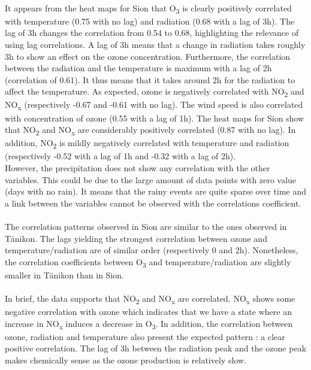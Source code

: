 \documentclass[a4paper, 12pt]{article}
\begin{document}
        \\
        It appears from the heat maps for Sion that O\textsubscript{3} is clearly positively correlated with temperature (0.75 with no lag) and radiation (0.68 with a lag of 3h). The lag of 3h changes the correlation from 0.54 to 0.68, highlighting the relevance of using lag correlations. A lag of 3h means that a change in radiation takes roughly 3h to show an effect on the ozone concentration. Furthermore, the correlation between the radiation and the temperature is maximum with a lag of 2h (correlation of 0.61). It thus means that it takes around 2h for the radiation to affect the temperature. As expected, ozone is negatively correlated with NO\textsubscript{2} and NO\textsubscript{x} (respectively -0.67 and -0.61 with no lag). The wind speed is also correlated with concentration of ozone (0.55 with a lag of 1h). The heat maps for Sion show that NO\textsubscript{2} and NO\textsubscript{x} are considerably positively correlated (0.87 with no lag). In addition, NO\textsubscript{2} is mildly negatively correlated with temperature and radiation (respectively -0.52 with a lag of 1h and -0.32 with a lag of 2h).
        \\
        However, the precipitation does not show any correlation with the other variables. This could be due to the large amount of data points with zero value (days with no rain). It means that the rainy events are quite sparse over time and a link between the variables cannot be observed with the correlations coefficient. \\
        \\
        The correlation patterns observed in Sion are similar to the ones observed in Tänikon. The lags yielding the strongest correlation between ozone and temperature/radiation are of similar order (respectively 0 and 2h). Nonetheless, the correlation coefficients between O\textsubscript{3} and temperature/radiation are slightly smaller in Tänikon than in Sion. 
        \\
        \\
        In brief, the data supports that NO\textsubscript{2} and NO\textsubscript{x} are correlated. NO\textsubscript{x} shows some negative correlation with ozone which indicates that we have a state where an increase in NO\textsubscript{x} induces a decrease in O\textsubscript{3}. In addition, the correlation between ozone, radiation and temperature also present the expected pattern : a clear positive correlation. The lag of 3h between the radiation peak and the ozone peak makes chemically sense as the ozone production is relatively slow. 
\end{document}
